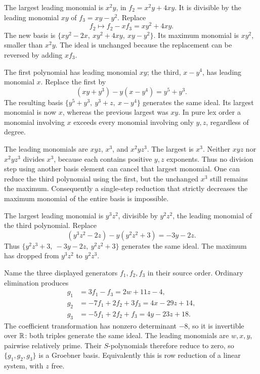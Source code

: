 The largest leading monomial is $x^2y$, in $f_2=x^2y+4xy$. It is divisible by the leading monomial $xy$ of $f_3=xy-y^2$. Replace
\[f_2\longmapsto f_2-xf_3=xy^2+4xy.\]
The new basis is $\{xy^2-2x,\ xy^2+4xy,\ xy-y^2\}$. Its maximum monomial is $xy^2$, smaller than $x^2y$. The ideal is unchanged because the replacement can be reversed by adding $xf_3$.

The first polynomial has leading monomial $xy$; the third, $x-y^4$, has leading monomial $x$. Replace the first by
\[(xy+y^3)-y(x-y^4)=y^5+y^3.\]
The resulting basis $\{y^5+y^3,\ y^3+z,\ x-y^4\}$ generates the same ideal. Its largest monomial is now $x$, whereas the previous largest was $xy$. In pure lex order a monomial involving $x$ exceeds every monomial involving only $y,z$, regardless of degree.

The leading monomials are $xyz$, $x^3$, and $x^2yz^3$. The largest is $x^3$. Neither $xyz$ nor $x^2yz^3$ divides $x^3$, because each contains positive $y,z$ exponents. Thus no division step using another basis element can cancel that largest monomial.
One can reduce the third polynomial using the first, but the unchanged $x^3$ still remains the maximum. Consequently a single-step reduction that strictly decreases the maximum monomial of the entire basis is impossible.

The largest leading monomial is $y^3z^2$, divisible by $y^2z^2$, the leading monomial of the third polynomial. Replace
\[(y^3z^2-2z)-y(y^2z^2+3)=-3y-2z.\]
Thus $\{y^2z^3+3,\ -3y-2z,\ y^2z^2+3\}$ generates the same ideal. The maximum has dropped from $y^3z^2$ to $y^2z^3$.

Name the three displayed generators $f_1,f_2,f_3$ in their source order. Ordinary elimination produces
\[
\begin{aligned}
g_1&=3f_1-f_3=2w+11z-4,\\
g_2&=-7f_1+2f_2+3f_3=4x-29z+14,\\
g_3&=-5f_1+2f_2+f_3=4y-23z+18.
\end{aligned}
\]
The coefficient transformation has nonzero determinant $-8$, so it is invertible over $\mathbb{R}$: both triples generate the same ideal. The leading monomials are $w,x,y$, pairwise relatively prime. Their $S$-polynomials therefore reduce to zero, so $\{g_1,g_2,g_3\}$ is a Groebner basis. Equivalently this is row reduction of a linear system, with $z$ free.

